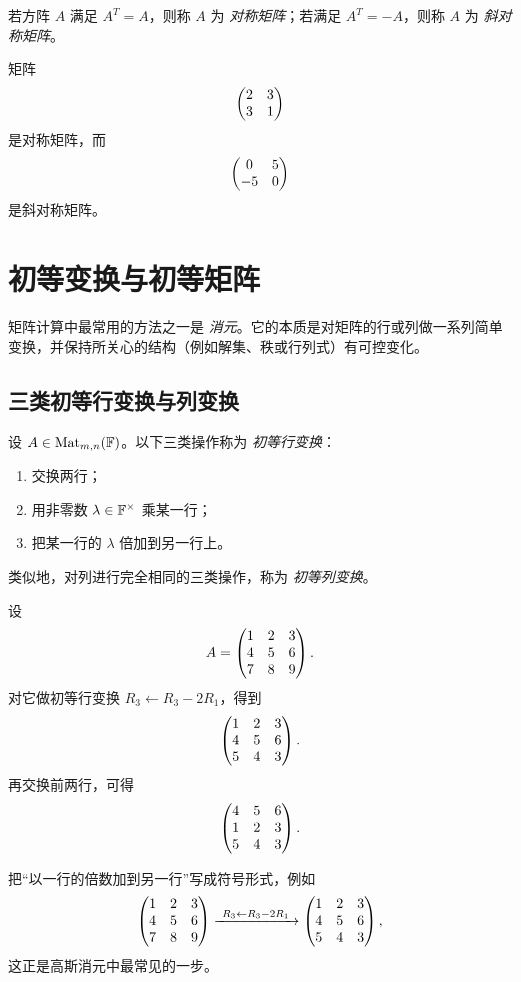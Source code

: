 \begin{definition}
若方阵 $A$ 满足 $A^T=A$，则称 $A$ 为 \emph{对称矩阵}；若满足 $A^T=-A$，则称 $A$ 为 \emph{斜对称矩阵}。
\end{definition}

\begin{example}
矩阵
\[
\begin{pmatrix} 2&3\\3&1 \end{pmatrix}
\]
是对称矩阵，而
\[
\begin{pmatrix} 0&5\\-5&0 \end{pmatrix}
\]
是斜对称矩阵。
\end{example}

\section{初等变换与初等矩阵}

矩阵计算中最常用的方法之一是 \emph{消元}。它的本质是对矩阵的行或列做一系列简单变换，并保持所关心的结构（例如解集、秩或行列式）有可控变化。

\subsection{三类初等行变换与列变换}

\begin{definition}
设 $A\in\mathrm{Mat}_{m,n}(\mathbb{F})$。以下三类操作称为 \emph{初等行变换}：
\begin{enumerate}[label=(\arabic*)]
  \item 交换两行；
  \item 用非零数 $\lambda\in\mathbb{F}^\times$ 乘某一行；
  \item 把某一行的 $\lambda$ 倍加到另一行上。
\end{enumerate}
类似地，对列进行完全相同的三类操作，称为 \emph{初等列变换}。
\end{definition}

\begin{example}
设
\[
A=\begin{pmatrix} 1&2&3\\4&5&6\\7&8&9 \end{pmatrix}.
\]
对它做初等行变换 $R_3\leftarrow R_3-2R_1$，得到
\[
\begin{pmatrix} 1&2&3\\4&5&6\\5&4&3 \end{pmatrix}.
\]
再交换前两行，可得
\[
\begin{pmatrix} 4&5&6\\1&2&3\\5&4&3 \end{pmatrix}.
\]
\end{example}

把“以一行的倍数加到另一行”写成符号形式，例如
\[
\begin{pmatrix} 1&2&3\\4&5&6\\7&8&9 \end{pmatrix}
\xrightarrow{\ R_3\leftarrow R_3-2R_1\ }
\begin{pmatrix} 1&2&3\\4&5&6\\5&4&3 \end{pmatrix},
\]
这正是高斯消元中最常见的一步。

